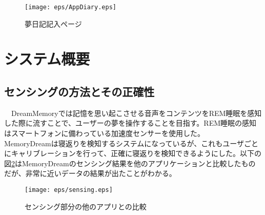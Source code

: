 \begin{figure}[htbp]
 \begin{minipage}{0.45\hsize}
  \begin{center}
   \texttt{[image: eps/AppDiary.eps]}
  \end{center}
  \caption{夢日記記入ページ}
  \label{le05}
 \end{minipage}
 \begin{minipage}{0.45\hsize}
 \end{minipage}
\end{figure}

\section{システム概要}
\subsection{センシングの方法とその正確性}
　DreamMemoryでは記憶を思い起こさせる音声をコンテンツをREM睡眠を感知した際に流すことで、ユーザーの夢を操作することを目指す。REM睡眠の感知はスマートフォンに備わっている加速度センサーを使用した。\\

MemoryDreamは寝返りを検知するシステムになっているが、これもユーザごとにキャリブレーションを行って、正確に寝返りを検知できるようにした。以下の図\ref{sensing}はMemoryDreamのセンシング結果を他のアプリケーションと比較したものだが、非常に近いデータの結果が出たことがわかる。

\begin{figure}[htbp]
\begin{center}
\texttt{[image: eps/sensing.eps]}
\caption{センシング部分の他のアプリとの比較}
\label{sensing}
\end{center}
\end{figure}